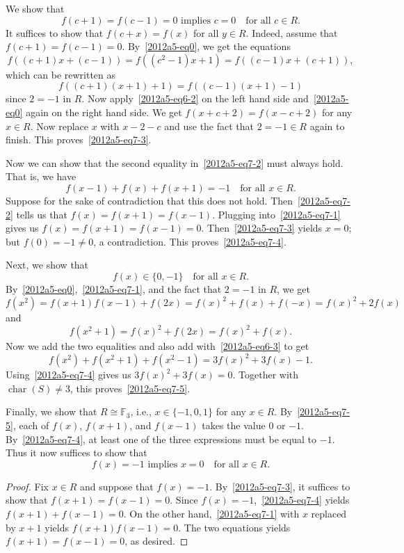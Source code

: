 \documentclass{article}
\newcommand{\F}{\mathbb{F}}
\DeclareMathOperator{\rchar}{char}
\begin{document}
We show that
\[ f(c + 1) = f(c - 1) = 0 \text{ implies } c = 0 \quad \text{for all } c \in R. \tag{7.3}\label{2012a5-eq7-3} \]
It suffices to show that $f(c + x) = f(x)$ for all $y \in R$.
Indeed, assume that $f(c + 1) = f(c - 1) = 0$.
By~\eqref{2012a5-eq0}, we get the equations
\[ f((c + 1) x + (c - 1)) = f((c^2 - 1) x + 1) = f((c - 1) x + (c + 1)), \]
    which can be rewritten as
\[ f((c + 1)(x + 1) + 1) = f((c - 1)(x + 1) - 1) \]
    since $2 = -1$ in $R$.
Now apply~\eqref{2012a5-eq6-2} on the left hand side and~\eqref{2012a5-eq0} again on the right hand side.
We get $f(x + c + 2) = f(x - c + 2)$ for any $x \in R$.
Now replace $x$ with $x - 2 - c$ and use the fact that $2 = -1 \in R$ again to finish.
This proves~\eqref{2012a5-eq7-3}.

Now we can show that the second equality in~\eqref{2012a5-eq7-2} must always hold.
That is, we have
\[ f(x - 1) + f(x) + f(x + 1) = -1 \quad \text{for all } x \in R. \tag{7.4}\label{2012a5-eq7-4} \]
Suppose for the sake of contradiction that this does not hold.
Then~\eqref{2012a5-eq7-2} tells us that $f(x) = f(x + 1) = f(x - 1)$.
Plugging into~\eqref{2012a5-eq7-1} gives us $f(x) = f(x + 1) = f(x - 1) = 0$.
Then~\eqref{2012a5-eq7-3} yields $x = 0$; but $f(0) = -1 \neq 0$, a contradiction.
This proves~\eqref{2012a5-eq7-4}.

Next, we show that
\[ f(x) \in \{0, -1\} \quad \text{for all } x \in R. \tag{7.5}\label{2012a5-eq7-5} \]
By~\eqref{2012a5-eq0},~\eqref{2012a5-eq7-1}, and the fact that $2 = -1$ in $R$, we get
\[ f(x^2) = f(x + 1) f(x - 1) + f(2x) = f(x)^2 + f(x) + f(-x) = f(x)^2 + 2 f(x) \]
    and
\[ f(x^2 + 1) = f(x)^2 + f(2x) = f(x)^2 + f(x). \]
Now we add the two equalities and also add with~\eqref{2012a5-eq6-3} to get
\[ f(x^2) + f(x^2 + 1) + f(x^2 - 1) = 3 f(x)^2 + 3 f(x) - 1. \]
Using~\eqref{2012a5-eq7-4} gives us $3 f(x)^2 + 3 f(x) = 0$.
Together with $\rchar(S) \neq 3$, this proves~\eqref{2012a5-eq7-5}.

Finally, we show that $R \cong \F_3$, i.e., $x \in \{-1, 0, 1\}$ for any $x \in R$.
By~\eqref{2012a5-eq7-5}, each of $f(x)$, $f(x + 1)$, and $f(x - 1)$ takes the value $0$ or $-1$.
By~\eqref{2012a5-eq7-4}, at least one of the three expressions must be equal to $-1$.
Thus it now suffices to show that
\[ f(x) = -1 \text{ implies } x = 0 \quad \text{for all } x \in R. \tag{7.6}\label{2012a5-eq7-6} \]

\begin{proof}
Fix $x \in R$ and suppose that $f(x) = -1$.
By~\eqref{2012a5-eq7-3}, it suffices to show that $f(x + 1) = f(x - 1) = 0$.
Since $f(x) = -1$,~\eqref{2012a5-eq7-4} yields $f(x + 1) + f(x - 1) = 0$.
On the other hand,~\eqref{2012a5-eq7-1} with $x$ replaced by $x + 1$ yields $f(x + 1) f(x - 1) = 0$.
The two equations yields $f(x + 1) = f(x - 1) = 0$, as desired.
\end{proof}
\end{document}
